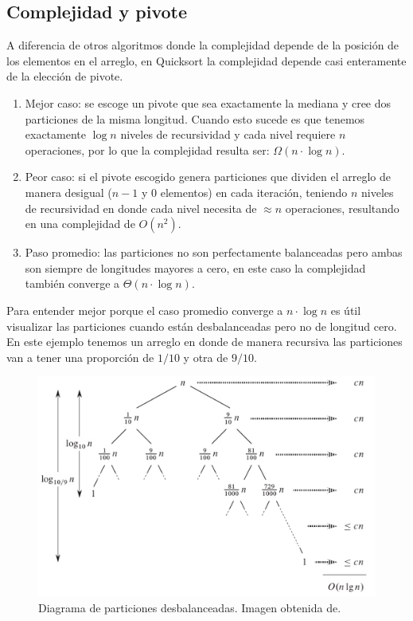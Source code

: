 \documentclass[conference]{IEEEtran}
\begin{document}
\subsection{Complejidad y pivote}
A diferencia de otros algoritmos donde la complejidad depende de la posición de los elementos en el arreglo, en Quicksort la complejidad depende casi enteramente de la elección de pivote.\cite{pivot}
\begin{enumerate}
    \item Mejor caso: se escoge un pivote que sea exactamente la mediana y cree dos particiones de la misma longitud.
Cuando esto sucede es que tenemos exactamente $\log{n}$ niveles de recursividad y cada nivel requiere $n$ operaciones, por lo que la complejidad resulta ser: $\Omega(n\cdot \log{n})$.
    \item Peor caso: si el pivote escogido genera particiones que dividen el arreglo de manera desigual ($n-1$ y $0$ elementos) en cada iteración, 
    teniendo $n$ niveles de recursividad en donde cada nivel necesita de $\approx n$ operaciones,
    resultando en una complejidad de $O(n^2)$.
    \item Paso promedio: las particiones no son perfectamente balanceadas pero ambas son siempre de longitudes mayores a cero, en este caso la complejidad también converge a $\Theta(n\cdot \log{n})$.
\end{enumerate}

Para entender mejor porque el caso promedio converge a $n \cdot\log{n}$ es útil visualizar las particiones cuando están desbalanceadas pero no de longitud cero.
En este ejemplo tenemos un arreglo en donde de manera recursiva las particiones van a tener una proporción de $1/10$ y otra de $9/10$.

\begin{figure}[h]
    \centering
    \includegraphics[scale=0.3]{convergence_avg_case.png}
    \caption{Diagrama de particiones desbalanceadas. Imagen obtenida de\cite{intro_algo}.}\label{fig:avg_case}
\end{figure}
\end{document}
